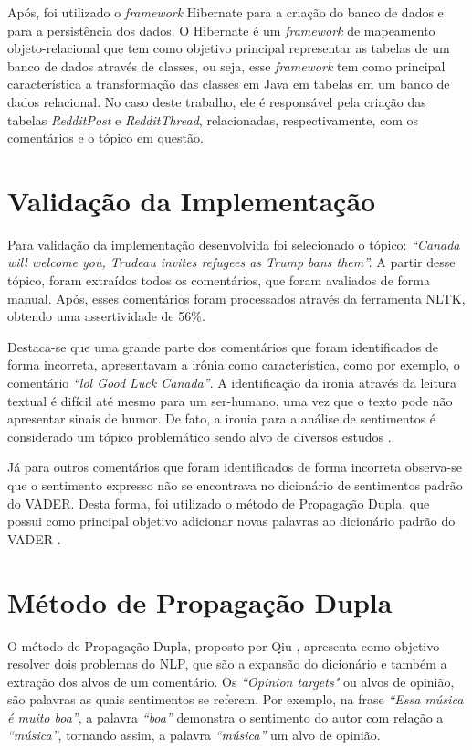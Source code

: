 Após, foi utilizado o \textit{framework} Hibernate
\cite{Iverson:2004:HJD:1044870} para a criação do banco de dados e para a
persistência dos dados. O Hibernate é um \textit{framework} de
mapeamento objeto-relacional que tem como objetivo principal representar as
tabelas de um banco de dados através de classes, ou seja, esse \textit{framework} tem como principal
característica a transformação das classes em Java em tabelas em um banco de
dados relacional.
No caso deste trabalho, ele é responsável pela criação das tabelas \textit{RedditPost} e
\textit{RedditThread}, relacionadas, respectivamente, com os comentários e o
tópico em questão. 

\section{Validação da Implementação}

Para validação da implementação desenvolvida foi selecionado o tópico:
\textit{``Canada will welcome you, Trudeau invites refugees as Trump bans
them''.}
A partir desse tópico, foram extraídos todos os comentários, que foram avaliados
de forma manual. Após, esses comentários foram processados através da ferramenta
\ac{NLTK}, obtendo uma assertividade de 56\%.

Destaca-se que uma grande parte dos comentários que foram identificados de forma
incorreta, apresentavam a irônia como característica, como por exemplo, o
comentário \textit{``lol Good Luck Canada''}. A identificação da ironia através
da leitura textual é difícil até mesmo para um ser-humano, uma vez que o
texto pode não apresentar sinais de humor. De fato, a ironia para a análise de
sentimentos é considerado um tópico problemático sendo alvo de diversos estudos \cite{DBLP:conf/lrec/StranisciBFP16}.

Já para outros comentários que foram identificados de forma incorreta
observa-se que o sentimento expresso não se encontrava no dicionário de
sentimentos padrão do \ac{VADER}. Desta forma, foi
utilizado o método de Propagação Dupla, que possui como principal objetivo
adicionar novas palavras ao dicionário
padrão do \ac{VADER} \cite{Qiu:2011:OWE:1970420.1970422}.

\section{Método de Propagação Dupla}

O método de Propagação Dupla, proposto por Qiu
\cite{Qiu:2011:OWE:1970420.1970422}, apresenta como objetivo resolver dois
problemas do \ac{NLP}, que são a expansão do dicionário e também a extração dos
alvos de um comentário. Os \textit{``Opinion targets"} ou alvos de opinião, são
palavras as quais sentimentos se referem. Por exemplo, na frase \textit{``Essa
música é muito boa''}, a palavra \textit{``boa''} demonstra o sentimento do
autor com relação a \textit{``música''}, tornando assim, a palavra
\textit{``música''} um alvo de opinião.

